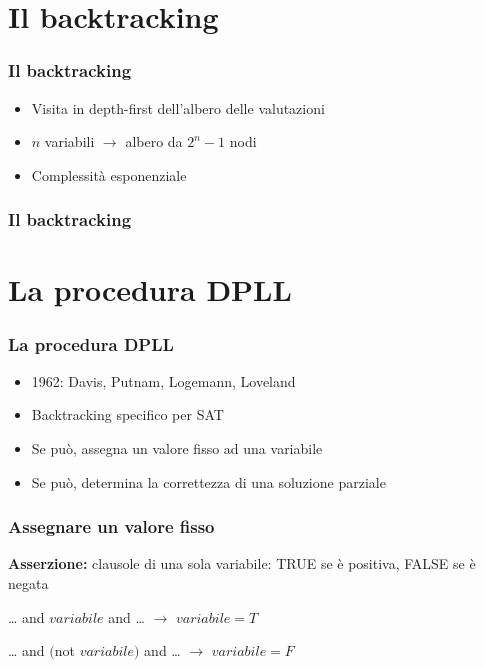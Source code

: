 \documentclass[12pt,xcolor=dvipsnames]{beamer}
\begin{document}
\section{Il backtracking}

\begin{frame}
	\frametitle{Il backtracking}
    \begin{center}
    \end{center}
	\begin{itemize}
	 \item Visita in depth-first dell'albero delle valutazioni \pause
	 \item $n$ variabili $\rightarrow$ albero da $2^{n}-1$ nodi \pause
     \item Complessità esponenziale
	\end{itemize}
\end{frame}

\begin{frame}
	\frametitle{Il backtracking}
    \begin{center}
    \end{center}
\end{frame}

\section{La procedura DPLL}

\begin{frame}
	\frametitle{La procedura DPLL}
	\begin{itemize}
	 \item 1962: Davis, Putnam, Logemann, Loveland \pause
	 \item Backtracking specifico per SAT \pause
     \item Se può, assegna un valore fisso ad una variabile \pause
     \item Se può, determina la correttezza di una soluzione parziale
	\end{itemize}
\end{frame}

\begin{frame}
	\frametitle{Assegnare un valore fisso}
	\textbf{Asserzione:} clausole di una sola variabile: TRUE se è positiva, FALSE se è negata \pause

    \begin{center}
        \ldots{} and $variabile$ and \ldots{} $\rightarrow$ $variabile = T$ \pause

        \ldots{} and $($not $variabile)$ and \ldots{} $\rightarrow$ $variabile = F$
    \end{center}
\end{frame}
\end{document}
